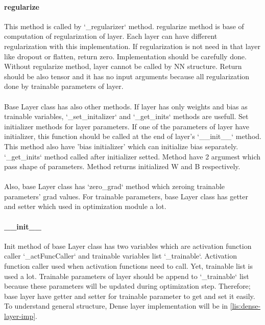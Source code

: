 \documentclass[12pt]{report}
\begin{document}
\paragraph{regularize}
This method is called by `\_regularizer` method. regularize method is base of computation of regularization of layer. Each layer can have different regularization with this implementation. 
If regularization is not need in that layer like dropout or flatten, return zero. Implementation should be carefully done. 
Without regularize method, layer cannot be called by NN structure. Return should be also tensor and it has no input arguments because all regularization done by trainable parameters of layer.

\paragraph{}
Base Layer class has also other methods. If layer has only weights and bias as trainable variables, `\_set\_initalizer` and `\_get\_inits` methods are usefull. Set initializer methods for layer parameters. If one of the parameters of layer have initializer, this function should be called at the end of layer's `\_\_init\_\_` method. This method also have 'bias initializer' which can initialize bias separately. `\_get\_inits` method called after initializer setted. Method have 2 argumest which pass shape of parameters. Method returns initialized W and B respectively.

\paragraph{}
Also, base Layer class has `zero\_grad` method which zeroing trainable parameters' grad values. For trainable parameters, base Layer class has getter and setter which used in optimization module a lot.

\paragraph{\_\_init\_\_}
Init method of base Layer class has two variables which are activation function caller `\_actFuncCaller` and trainable variables list `\_trainable`. Activation function caller used when activation functions need to call. Yet, trainable list is used a lot. Trainable parameters of layer should be append to `\_trainable` list because these parameters will be updated during optimization step. Therefore; base layer have getter and setter for trainable parameter to get and set it easily. To understand general structure, Dense layer implementation will be in \ref{lis:dense-layer-imp}.
\end{document}
